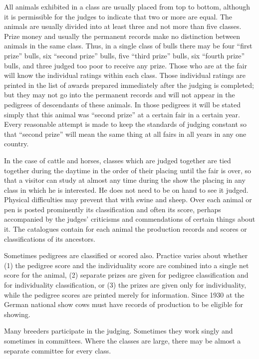 All animals exhibited in a class are usually placed from top to bottom,
although it is permissible for the judges to indicate that two or
more are equal. The animals are usually divided into at least three and
not more than five classes. Prize money and usually the permanent records
make no distinction between animals in the same class. Thus, in a
single class of bulls there may be four ``first prize'' bulls, six ``second
prize'' bulls, five ``third prize'' bulls, six ``fourth prize'' bulls, and three
judged too poor to receive any prize. Those who are at the fair will
know the individual ratings within each class. Those individual ratings
are printed in the list of awards prepared immediately after the judging
is completed; but they may not go into the permanent records and
will not appear in the pedigrees of descendants of these animals. In
those pedigrees it will be stated simply that this animal was ``second
prize'' at a certain fair in a certain year. Every reasonable attempt is
made to keep the standards of judging constant so that ``second prize''
will mean the same thing at all fairs in all years in any one country.

In the case of cattle and horses, classes which are judged together
are tied together during the daytime in the order of their placing until
the fair is over, so that a visitor can study at almost any time during the
show the placing in any class in which he is interested. He does not need
to be on hand to see it judged. Physical difficulties may prevent that
with swine and sheep. Over each animal or pen is posted prominently
its classification and often its score, perhaps accompanied by the judges'
criticisms and commendations of certain things about it. The catalogues
contain for each animal the production records and scores or
classifications of its ancestors.

Sometimes pedigrees are classified or scored also. Practice varies
about whether (1) the pedigree score and the individuality score are
combined into a single net score for the animal, (2) separate prizes are
given for pedigree classification and for individuality classification, or
(3) the prizes are given only for individuality, while the pedigree scores
are printed merely for information. Since 1930 at the German national
show cows must have records of production to be eligible for showing.

Many breeders participate in the judging. Sometimes they work
singly and sometimes in committees. Where the classes are large, there
may be almost a separate committee for every class.

